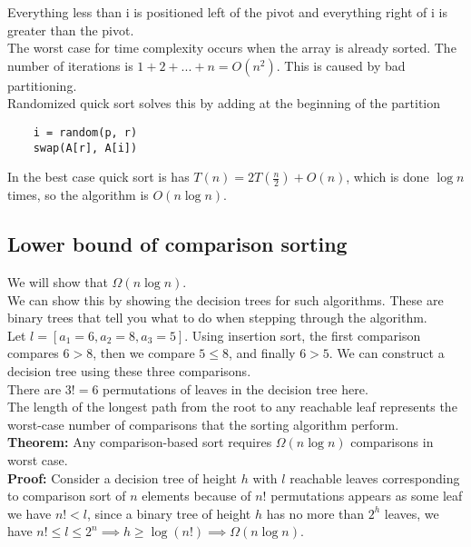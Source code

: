 \documentclass[]{article}
\begin{document}
Everything less than i is positioned left of the pivot and everything right of i is greater than the pivot.\\

The worst case for time complexity occurs when the array is already sorted. The number of iterations is $1+2+...+n = O(n^2)$. This is caused by bad partitioning.\\

Randomized quick sort solves this by adding at the beginning of the partition

\begin{lstlisting}
	i = random(p, r)
	swap(A[r], A[i])
\end{lstlisting}\bigbreak

In the best case quick sort is has $T(n) = 2 T(\frac{n}{2}) + O(n)$, which is done $\log n$ times, so the algorithm is $O(n \log n)$.\\


\subsection{Lower bound of comparison sorting} \bigbreak

We will show that $\Omega(n\log n)$. \\

We can show this by showing the decision trees for such algorithms. These are binary trees that tell you what to do when stepping through the algorithm. \\

Let $l=[a_1=6, a_2=8, a_3=5]$. Using insertion sort, the first comparison compares $6>8$, then we compare $5\leq 8$, and finally $6>5$. We can construct a decision tree using these three comparisons.\\


There are $3! = 6$ permutations of leaves in the decision tree here. \\

The length of the longest path from the root to any reachable leaf represents the worst-case number of comparisons that the sorting algorithm perform.\\

\textbf{Theorem:} Any comparison-based sort requires $\Omega(n \log n)$ comparisons in worst case.\\

\textbf{Proof:} Consider a decision tree of height $h$ with $l$ reachable leaves corresponding to comparison sort of $n$ elements because of $n!$ permutations appears as some leaf we have $n! < l$, since a binary tree of height $h$ has no more than $2^h$ leaves, we have $n! \leq l \leq 2^n \implies h \geq \log(n!) \implies \Omega(n\log n)$. \\
\end{document}

